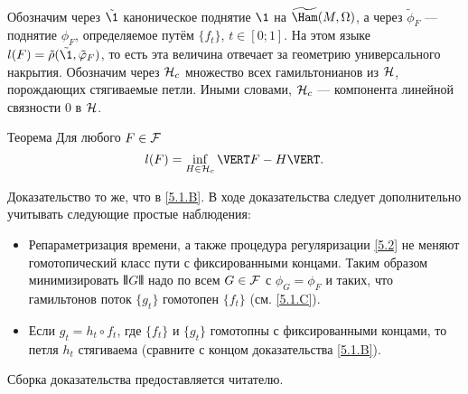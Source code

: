 Обозначим через $\tilde\1$ каноническое поднятие $\1$ на
$\widetilde\Ham(M, \Omega)$, а через 
$\tilde\phi_F$ — поднятие $\phi_F$, определяемое путём $\{f_t\}$, $t
\in [0; 1]$. 
На этом языке $l (F) = \tilde\rho (\tilde\1, \tilde\phi_F)$, то есть
эта величина отвечает за геометрию универсального накрытия. 
Обозначим через $\mathcal{H}_c$ множество всех гамильтонианов из $\mathcal{H}$,
порождающих стягиваемые петли. 
Иными словами, $\mathcal{H}_c$ — компонента линейной связности $0$ в $\mathcal{H}$.

\begin{thm}{Теорема}\label{5.3.A}
Для любого $F \in \mathcal{F}$ 
\[l (F) = \inf_{H\in\H_c} \VERT F - H \VERT.\]
\end{thm}

Доказательство то же, что в \ref{5.1.B}.
В ходе доказательства следует дополнительно учитывать следующие простые наблюдения:
\begin{itemize}
\item Репараметризация времени, а также процедура регуляризации \ref{5.2} не меняют гомотопический класс пути с фиксированными концами.
Таким образом минимизировать $\VERT G \VERT$ надо по всем $G \z\in \F$ с $\phi_G = \phi_F$ и таких, что гамильтонов поток $\{g_t\}$ гомотопен $\{f_t\}$ (см. \ref{5.1.C}).
\item Если $g_t = h_t \circ f_t$, где $\{f_t\}$ и $\{g_t\}$ гомотопны с фиксированными концами, то петля $h_t$ стягиваема (сравните с концом доказательства \ref{5.1.B}).
\end{itemize}
Сборка доказательства предоставляется читателю.
